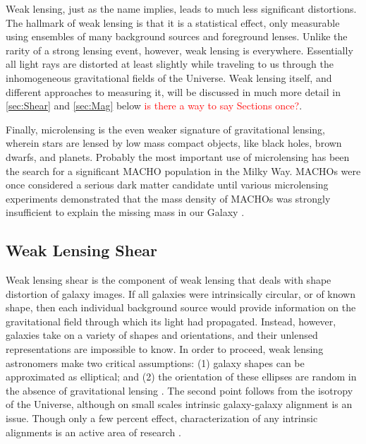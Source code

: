Weak lensing, just as the name implies, leads to much less significant distortions. The hallmark of weak lensing is that it is a statistical effect, only measurable using ensembles of many background sources and foreground lenses. Unlike the rarity of a strong lensing event, however, weak lensing is everywhere. Essentially all light rays are distorted at least slightly while traveling to us through the inhomogeneous gravitational fields of the Universe. Weak lensing itself, and different approaches to measuring it, will be discussed in much more detail in \autoref{sec:Shear} and \autoref{sec:Mag} below \textcolor{red}{is there a way to say Sections once?}. 

Finally, microlensing is the even weaker signature of gravitational lensing, wherein stars are lensed by low mass compact objects, like black holes, brown dwarfs, and planets. Probably the most important use of microlensing has been the search for a significant \acf{MACHO} population in the Milky Way. \ac{MACHO}s were once considered a serious dark matter candidate until various microlensing experiments demonstrated that the mass density of \ac{MACHO}s was strongly insufficient to explain the missing mass in our Galaxy \citep{Paczynski96,Wyrzykowski11,Sumi13}.


\subsection{Weak Lensing Shear}
\label{sec:Shear}

Weak lensing shear is the component of weak lensing that deals with shape distortion of galaxy images. If all galaxies were intrinsically circular, or of known shape, then each individual background source would provide information on the gravitational field through which its light had propagated. Instead, however, galaxies take on a variety of shapes and orientations, and their unlensed representations are impossible to know. In order to proceed, weak lensing astronomers make two critical assumptions: (1) galaxy shapes can be approximated as elliptical; and (2) the orientation of these ellipses are random in the absence of gravitational lensing \citep{BS01}. The second point follows from the isotropy of the Universe, although on small scales intrinsic galaxy-galaxy alignment is an issue. Though only a few percent effect, characterization of any intrinsic alignments is an active area of research \citep[see e.g.][]{Hirata04,Heymans13}.

